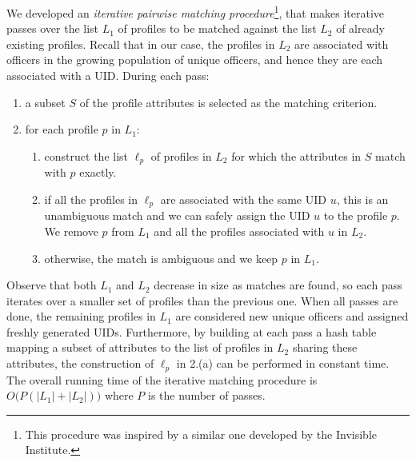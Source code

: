 We developed an \emph{iterative pairwise matching procedure}\footnote{This
procedure was inspired by a similar one developed by the Invisible Institute.},
that makes iterative passes over the list $L_1$ of profiles to be matched
against the list $L_2$ of already existing profiles. Recall that in our case,
the profiles in $L_2$ are associated with officers in the growing population of
unique officers, and hence they are each associated with a UID. During each
pass:
\begin{enumerate}
	\item a subset $S$ of the profile attributes is selected as the matching
		criterion.
	\item for each profile $p$ in $L_1$:
		\begin{enumerate}
			\item construct the list $\ell_p$ of profiles in $L_2$ for which
				the attributes in $S$ match with $p$ exactly.
			\item if all the profiles in $\ell_p$ are associated with the same
				UID $u$, this is an unambiguous match and we can safely assign
				the UID $u$ to the profile $p$. We remove $p$ from $L_1$ and
				all the profiles associated with $u$ in $L_2$.
			\item otherwise, the match is ambiguous and we keep $p$ in
				$L_1$.
		\end{enumerate}
\end{enumerate}
Observe that both $L_1$ and $L_2$ decrease in size as matches are found, so
each pass iterates over a smaller set of profiles than the previous one. When
all passes are done, the remaining profiles in $L_1$ are considered new
unique officers and assigned freshly generated UIDs. Furthermore, by
building at each pass a hash table mapping a subset of attributes to the
list of profiles in $L_2$ sharing these attributes, the construction of
$\ell_p$ in 2.(a) can be performed in constant time. The overall running time of the
  iterative matching procedure is $O\big(P(|L_1|+|L_2|)\big)$ where $P$ is the
  number of passes.

